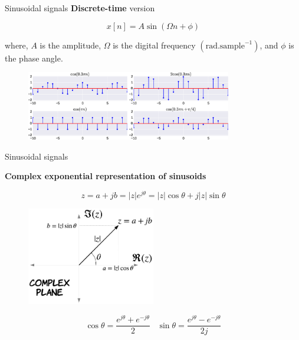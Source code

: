 \documentclass[aspectratio=169]{beamer}
\begin{document}
\begin{frame}{Sinusoidal signals}
\textbf{Discrete-time} version

\[ x[n] = A \sin \left(\Omega n + \phi\right) \]

where, $A$ is the amplitude, $\Omega$ is the digital frequency $\left(\mathrm{rad}.\mathrm{sample}^{-1}\right)$, and $\phi$ is the phase angle.

\begin{figure}
\includegraphics[width=0.8\textwidth]{img/disc_sinu.eps}
\end{figure}

\end{frame}


\begin{frame}{Sinusoidal signals}\

\textbf{Complex exponential representation of sinusoids}

\[ z = a + jb = \left|z\right|e^{j\theta} = \left|z\right|\cos \theta + j \left|z\right|\sin \theta\]

\begin{figure}
\includegraphics[width=0.5\textwidth]{img/complex_plane.png}
\end{figure}

\[ \cos \theta = \frac{e^{j\theta} + e^{-j\theta}}{2} \,\,\,\,\, \sin \theta = \frac{e^{j\theta} - e^{-j\theta}}{2j}\]

\end{frame}
\end{document}
